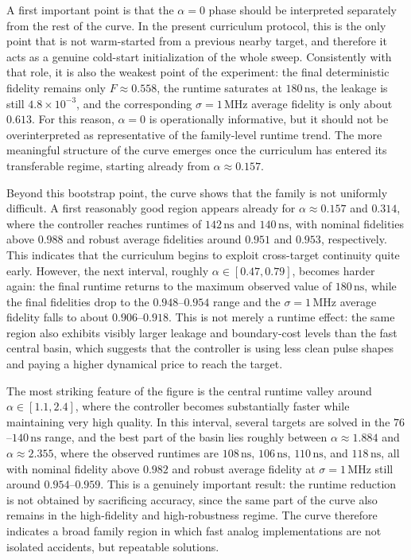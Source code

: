 A first important point is that the \(\alpha=0\) phase should be interpreted separately from the rest of the
curve. In the present curriculum protocol, this is the only point that is not warm-started from a previous nearby
target, and therefore it acts as a genuine cold-start initialization of the whole sweep. Consistently with that
role, it is also the weakest point of the experiment: the final deterministic fidelity remains only
\(F \approx 0.558\), the runtime saturates at \(180\,\mathrm{ns}\), the leakage is still
\(4.8\times 10^{-3}\), and the corresponding \(\sigma=1\,\mathrm{MHz}\) average fidelity is only about \(0.613\).
For this reason, \(\alpha=0\) is operationally informative, but it should not be overinterpreted as representative
of the family-level runtime trend. The more meaningful structure of the curve emerges once the curriculum has
entered its transferable regime, starting already from \(\alpha \approx 0.157\).

Beyond this bootstrap point, the curve shows that the family is not uniformly difficult. A first reasonably good
region appears already for \(\alpha \approx 0.157\) and \(0.314\), where the controller reaches runtimes of
\(142\,\mathrm{ns}\) and \(140\,\mathrm{ns}\), with nominal fidelities above \(0.988\) and robust average
fidelities around \(0.951\) and \(0.953\), respectively. This indicates that the curriculum begins to exploit
cross-target continuity quite early. However, the next interval, roughly
\(\alpha \in [0.47,0.79]\), becomes harder again: the final runtime returns to the maximum observed value of
\(180\,\mathrm{ns}\), while the final fidelities drop to the \(0.948\)--\(0.954\) range and the
\(\sigma=1\,\mathrm{MHz}\) average fidelity falls to about \(0.906\)--\(0.918\). This is not merely a runtime
effect: the same region also exhibits visibly larger leakage and boundary-cost levels than the fast central basin,
which suggests that the controller is using less clean pulse shapes and paying a higher dynamical price to reach
the target.

The most striking feature of the figure is the central runtime valley around
\(\alpha \in [1.1,2.4]\), where the controller becomes substantially faster while maintaining very high quality.
In this interval, several targets are solved in the \(76\)--\(140\,\mathrm{ns}\) range, and the best part of the
basin lies roughly between \(\alpha \approx 1.884\) and \(\alpha \approx 2.355\), where the observed runtimes are
\(108\,\mathrm{ns}\), \(106\,\mathrm{ns}\), \(110\,\mathrm{ns}\), and \(118\,\mathrm{ns}\), all with nominal
fidelity above \(0.982\) and robust average fidelity at \(\sigma=1\,\mathrm{MHz}\) still around
\(0.954\)--\(0.959\). This is a genuinely important result: the runtime reduction is not obtained by sacrificing
accuracy, since the same part of the curve also remains in the high-fidelity and high-robustness regime. The curve
therefore indicates a broad family region in which fast analog implementations are not isolated accidents, but
repeatable solutions.

